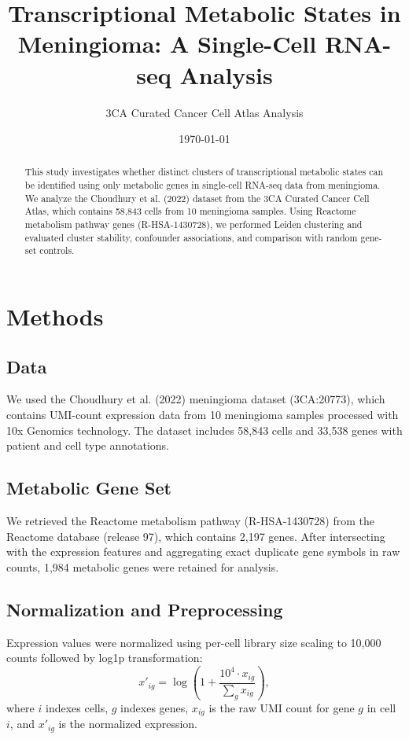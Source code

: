 \documentclass[11pt,a4paper]{article}
\title{Transcriptional Metabolic States in Meningioma: A Single-Cell RNA-seq Analysis}
\author{3CA Curated Cancer Cell Atlas Analysis}
\date{\today}
\begin{document}
\maketitle

\begin{abstract}
This study investigates whether distinct clusters of transcriptional metabolic states can be identified using only metabolic genes in single-cell RNA-seq data from meningioma. We analyze the Choudhury et al. (2022) dataset from the 3CA Curated Cancer Cell Atlas, which contains 58,843 cells from 10 meningioma samples. Using Reactome metabolism pathway genes (R-HSA-1430728), we performed Leiden clustering and evaluated cluster stability, confounder associations, and comparison with random gene-set controls.
\end{abstract}

\section{Methods}

\subsection{Data}
We used the Choudhury et al. (2022) meningioma dataset (3CA:20773), which contains UMI-count expression data from 10 meningioma samples processed with 10x Genomics technology. The dataset includes 58,843 cells and 33,538 genes with patient and cell type annotations.

\subsection{Metabolic Gene Set}
We retrieved the Reactome metabolism pathway (R-HSA-1430728) from the Reactome database (release 97), which contains 2,197 genes. After intersecting with the expression features and aggregating exact duplicate gene symbols in raw counts, 1,984 metabolic genes were retained for analysis.

\subsection{Normalization and Preprocessing}
Expression values were normalized using per-cell library size scaling to 10,000 counts followed by log1p transformation:
\begin{equation}
x'_{ig} = \log\left(1 + \frac{10^4 \cdot x_{ig}}{\sum_{g} x_{ig}}\right),
\end{equation}
where $i$ indexes cells, $g$ indexes genes, $x_{ig}$ is the raw UMI count for gene $g$ in cell $i$, and $x'_{ig}$ is the normalized expression.
\end{document}
